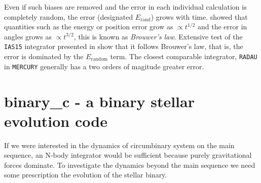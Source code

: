 \documentclass[ twoside,openright,titlepage,numbers=noenddot,headinclude,%
                footinclude=true,cleardoublepage=empty,abstractoff, %
                BCOR=5mm,paper=a4,fontsize=11pt,%
                american,%
                ]{scrreprt}
\begin{document}
Even if such biases are removed and the error in each individual calculation is
completely random, the error (designated $E_\text{rand}$) grows with time. 
\cite{brouwer} showed that  quantities such as the energy  or position error
grow as $\propto t^{1/2}$ and the error in angles grows as $\propto t^{3/2}$,
this is known as \emph{Brouwer's law}.
Extensive test of the \texttt{IAS15} integrator presented in \cite{Rein2014} 
show that it follows Brouwer's law, that is, the error is dominated by the 
$E_\text{random}$ term. The closest comparable integrator, \texttt{RADAU}
in \texttt{MERCURY} generally has a two orders of magitude greater error. 

\section{binary\_c - a binary stellar evolution code}
\label{sec:binary_c}
If we were interested in the dynamics of circumbinary system on the main 
sequence, an N-body integrator would be sufficient because purely gravitational
forces dominate. To investigate the dynamics beyond the main sequence we 
need some prescription the evolution of the stellar binary. 
\end{document}
